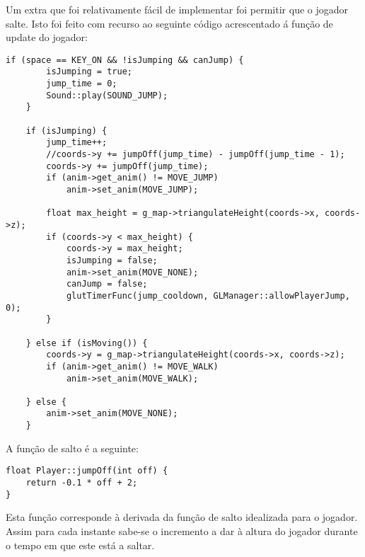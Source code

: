 Um extra que foi relativamente fácil de implementar foi permitir que o jogador salte.
Isto foi feito com recurso ao seguinte código acrescentado á função de update do jogador:

\begin{lstlisting}
if (space == KEY_ON && !isJumping && canJump) {
		isJumping = true;
		jump_time = 0;
		Sound::play(SOUND_JUMP);
	}

	if (isJumping) {
		jump_time++;
		//coords->y += jumpOff(jump_time) - jumpOff(jump_time - 1);
		coords->y += jumpOff(jump_time);
		if (anim->get_anim() != MOVE_JUMP)
			anim->set_anim(MOVE_JUMP);

		float max_height = g_map->triangulateHeight(coords->x, coords->z);
		if (coords->y < max_height) {
			coords->y = max_height;
			isJumping = false;
			anim->set_anim(MOVE_NONE);
			canJump = false;
			glutTimerFunc(jump_cooldown, GLManager::allowPlayerJump, 0);
		}

	} else if (isMoving()) {
		coords->y = g_map->triangulateHeight(coords->x, coords->z);
		if (anim->get_anim() != MOVE_WALK)
			anim->set_anim(MOVE_WALK);

	} else {
		anim->set_anim(MOVE_NONE);
	}
\end{lstlisting}

A função de salto é a seguinte:

\begin{lstlisting}
float Player::jumpOff(int off) {
	return -0.1 * off + 2;
}
\end{lstlisting}

Esta função corresponde à derivada da função de salto idealizada para o jogador. Assim para cada instante sabe-se o incremento a dar à altura do jogador durante o tempo em que este está a saltar.
